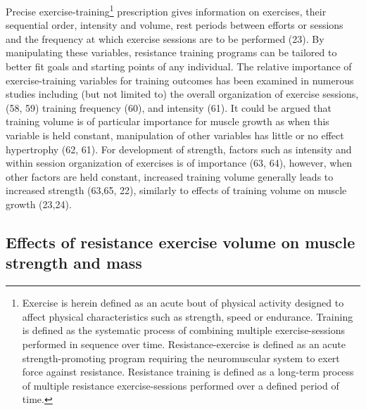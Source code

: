 \documentclass[twoside,10pt]{gihclass} %
\begin{document}
Precise exercise-training\footnote{Exercise is herein defined as an acute bout of physical activity designed to affect physical characteristics such as strength, speed or endurance. Training is defined as the systematic process of combining multiple exercise-sessions performed in sequence over time. Resistance-exercise is defined as an acute strength-promoting program requiring the neuromuscular system to exert force against resistance. Resistance training is defined as a long-term process of multiple resistance exercise-sessions performed over a defined period of time.}
prescription gives information on exercises, their sequential order, intensity and volume, rest periods between efforts or sessions and the frequency at which exercise sessions are to be performed
(23).
By manipulating these variables, resistance training programs can be tailored to better fit goals and starting points of any individual.
The relative importance of exercise-training variables for training outcomes has been examined in numerous studies including (but not limited to) the overall organization of exercise sessions,
(58, 59)
training frequency
(60),
and intensity
(61).
It could be argued that training volume is of particular importance for muscle growth as when this variable is held constant, manipulation of other variables has little or no effect hypertrophy
(62, 61).
For development of strength, factors such as intensity and within session organization of exercises is of importance
(63, 64),
however, when other factors are held constant, increased training volume generally leads to increased strength
(63,65, 22),
similarly to effects of training volume on muscle growth
(23,24).

\hypertarget{effects-of-resistance-exercise-volume-on-muscle-strength-and-mass}{%
\subsection{Effects of resistance exercise volume on muscle strength and mass}\label{effects-of-resistance-exercise-volume-on-muscle-strength-and-mass}}
\end{document}
